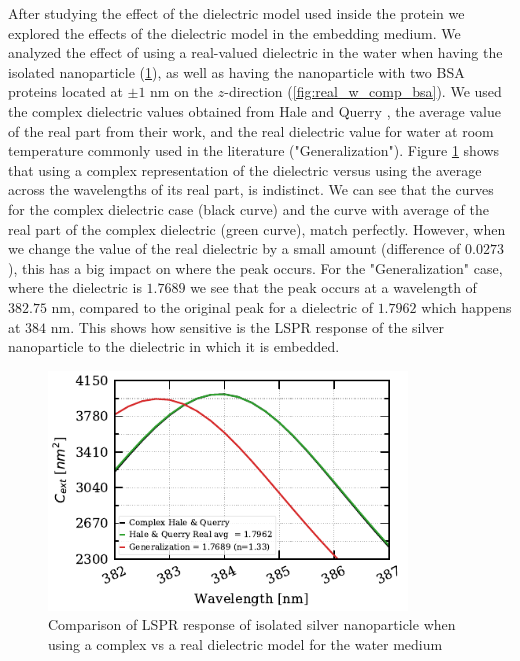 After studying the effect of the dielectric model used inside the protein we explored the effects of the dielectric model in the 
embedding medium. We analyzed the effect of using a real-valued dielectric in the water when having the isolated nanoparticle (\ref{fig:iso_NP_diel}), 
as well as having the nanoparticle with two BSA proteins located at $\pm1$ nm on the $z$-direction (\ref{fig:real_w_comp_bsa}). We used
the complex dielectric values obtained from Hale and Querry \cite{HaleQuerry1972}, the average value of the real part from their work, and the real 
dielectric value for water at room temperature commonly used in the literature ("Generalization"). Figure \ref{fig:iso_NP_diel} shows
that using a complex representation of the dielectric versus using the average across the wavelengths of its real part, is indistinct. We can see that the curves
for the complex dielectric case (black curve) and the curve with average of the real part of the complex dielectric (green curve), match perfectly. However, when we
change the value of the real dielectric by a small amount (difference of $0.0273$), this has a big impact on where the peak occurs. For the "Generalization" case, where 
the dielectric is $1.7689$ we see that the peak occurs at a wavelength of $382.75$ nm, compared to the original peak for a dielectric of $1.7962$ which happens at $384$ nm. This shows
how sensitive is the LSPR response of the silver nanoparticle to the dielectric in which it is embedded. 
 
\begin{figure} %
    \centering
    \includegraphics[width=0.85\textwidth]{iso_np_water_diel_study.pdf} 
    \caption{Comparison of LSPR response of isolated silver nanoparticle when using a complex 
     vs a real dielectric model for the water medium}
    \label{fig:iso_NP_diel}
 \end{figure}

